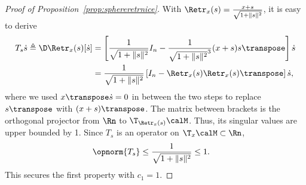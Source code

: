 \begin{proof}[Proof of Proposition~\ref{prop:sphereretrnice}]
	With $\Retr_x(s) = \frac{x+s}{\sqrt{1+\|s\|^2}}$, it is easy to derive
	\begin{align}
		T_s \dot s \triangleq \D\Retr_x(s)[\dot s] & = \left[ \frac{1}{\sqrt{1+\|s\|^2}} I_n - \frac{1}{\sqrt{1+\|s\|^2}^3} (x+s)s\transpose \right] \dot s \nonumber \\
		& = \frac{1}{\sqrt{1+\|s\|^2}} \left[ I_n - \Retr_x(s) \Retr_x(s)\transpose \right] \dot s,
		\label{eq:DretrSphere}
	\end{align}
	where we used $x\transpose \dot s = 0$ in between the two steps to replace $s\transpose$ with $(x+s)\transpose$.
	The matrix between brackets is the orthogonal projector from $\Rn$ to $\T_{\Retr_x(s)}\calM$. Thus, its singular values are upper bounded by 1. Since $T_s$ is an operator on $\T_x\calM \subset \Rn$, 
	\begin{align*}
		\opnorm{T_s} & \leq \frac{1}{\sqrt{1+\|s\|^2}} \leq 1.
	\end{align*}
	This secures the first property with $c_1 = 1$.
	

\end{proof}
